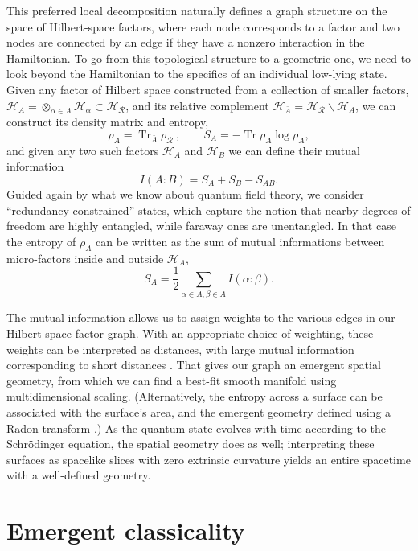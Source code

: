 \documentclass[12pt,english]{article}
\newcommand{\be}{\begin{equation}}
\newcommand{\ee}{\end{equation}}
\newcommand{\Tr}{\operatorname{Tr}}
\newcommand{\HH}{\mathcal{H}}
\DeclareMathOperator{\co}{:}
\newcommand{\R}{\mathcal{R}}
\begin{document}
This preferred local decomposition naturally defines a graph structure on the space of Hilbert-space factors, where each node corresponds to a factor and two nodes are connected by an edge if they have a nonzero interaction in the Hamiltonian.
To go from this topological structure to a geometric one, we need to look beyond the Hamiltonian to the specifics of an individual low-lying state.
Given any factor of Hilbert space constructed from a collection of smaller factors, $\HH_A = \otimes_{\alpha \in A} \HH_\alpha \subset \HH_\R$, and its relative complement $\HH_{\bar A} = \HH_\R \backslash \HH_A$, we can construct its density matrix and entropy,
\be
  \rho_A = \Tr_{\bar A} \rho_\R\ ,\qquad S_A = - \Tr \rho_A \log \rho_A,
\ee
and given any two such factors $\HH_A$ and $\HH_B$ we can define their mutual information
\be
  I(A\co B) = S_A + S_B - S_{AB}.
\ee
Guided again by what we know about quantum field theory, we consider ``redundancy-constrained'' states, which capture the notion that nearby degrees of freedom are highly entangled, while faraway ones are unentangled.
In that case the entropy of $\rho_A$ can be written as the sum of mutual informations between micro-factors inside and outside $\HH_A$,
\be
  S_A = \frac{1}{2} \sum_{\alpha\in A, \beta \in \bar A} I(\alpha \co \beta).
\ee

The mutual information allows us to assign weights to the various edges in our Hilbert-space-factor graph.
With an appropriate choice of weighting, these weights can be interpreted as distances, with large mutual information corresponding to short distances \cite{Cao:2016mst}.
That gives our graph an emergent spatial geometry, from which we can find a best-fit smooth manifold using multidimensional scaling.
(Alternatively, the entropy across a surface can be associated with the surface's area, and the emergent geometry defined using a Radon transform \cite{Cao:2017hrv}.)
As the quantum state evolves with time according to the Schr\"odinger equation, the spatial geometry does as well; interpreting these surfaces as spacelike slices with zero extrinsic curvature yields an entire spacetime with a well-defined geometry.

\section {Emergent classicality}
\end{document}
